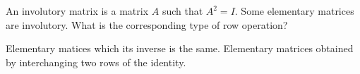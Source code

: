 
\begin{Exercise}[
name={},
title={}, 
difficulty=0,
origin={\cite{MH}}]
An involutory matrix is a matrix $A$ such that $A^2=I$.
Some elementary matrices are involutory. What is the corresponding type of row operation?
\end{Exercise}

\begin{Answer}
Elementary matices which its inverse is the same. Elementary matrices obtained by interchanging two rows of the identity.
\end{Answer}

